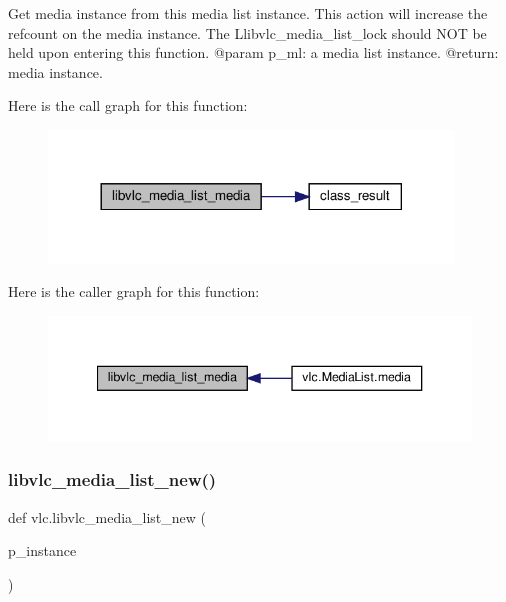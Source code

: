 \begin{DoxyVerb}Get media instance from this media list instance. This action will increase
the refcount on the media instance.
The L{libvlc_media_list_lock} should NOT be held upon entering this function.
@param p_ml: a media list instance.
@return: media instance.
\end{DoxyVerb}
 Here is the call graph for this function\+:
\nopagebreak
\begin{figure}[H]
\begin{center}
\leavevmode
\includegraphics[width=305pt]{namespacevlc_a9057b31381e40f017185409aaf8c8ab7_cgraph}
\end{center}
\end{figure}
Here is the caller graph for this function\+:
\nopagebreak
\begin{figure}[H]
\begin{center}
\leavevmode
\includegraphics[width=340pt]{namespacevlc_a9057b31381e40f017185409aaf8c8ab7_icgraph}
\end{center}
\end{figure}
\mbox{\label{namespacevlc_ade7073aea18b2eb92b103ed962f73d95}} 
\subsubsection{\texorpdfstring{libvlc\+\_\+media\+\_\+list\+\_\+new()}{libvlc\_media\_list\_new()}}
{\footnotesize\ttfamily def vlc.\+libvlc\+\_\+media\+\_\+list\+\_\+new (\begin{DoxyParamCaption}\item[{}]{p\+\_\+instance }\end{DoxyParamCaption})}

